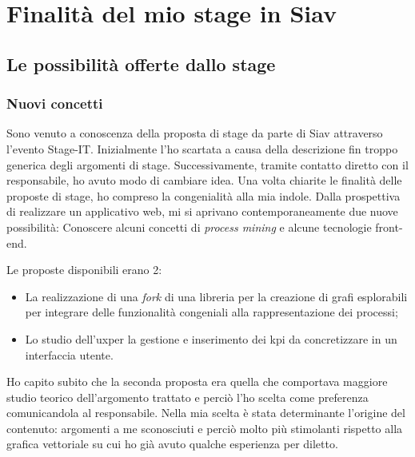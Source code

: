 
\chapter{Finalità del mio stage in Siav}
\label{cap:process-mining}
\section{Le possibilità offerte dallo stage}
\subsection{Nuovi concetti}
Sono venuto a conoscenza della proposta di stage da parte di Siav attraverso l'evento Stage-IT. Inizialmente l'ho scartata a causa della descrizione fin troppo generica degli argomenti di stage. Successivamente, tramite contatto diretto con il responsabile, ho avuto modo di cambiare idea. Una volta chiarite le finalità delle proposte di stage, ho compreso la congenialità alla mia indole. Dalla prospettiva di realizzare un applicativo web, mi si aprivano contemporaneamente due nuove possibilità: Conoscere alcuni concetti di \textit{process mining} e alcune tecnologie front-end.


Le proposte disponibili erano 2:
\begin{itemize}
    \item La realizzazione di una \textit{fork} di una libreria per la creazione di grafi esplorabili per integrare delle funzionalità congeniali alla rappresentazione dei processi; 
    \item Lo studio dell'\acrshort{ux}\glsfirstoccur per la gestione e inserimento dei \acrshort{kpi} da concretizzare in un interfaccia utente.
\end{itemize}

Ho capito subito che la seconda proposta era quella che comportava maggiore studio teorico dell'argomento trattato e perciò l'ho scelta come preferenza comunicandola al responsabile. Nella mia scelta è stata determinante l'origine del contenuto: argomenti a me sconosciuti e perciò molto più stimolanti rispetto alla grafica vettoriale su cui ho già avuto qualche esperienza per diletto.
